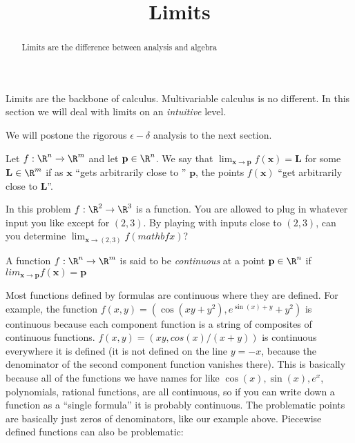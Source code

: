 \documentclass{ximera}
\title{Limits}
\begin{document}
\begin{abstract}
	Limits are the difference between analysis and algebra
\end{abstract}


Limits are the backbone of calculus.  Multivariable calculus is no different.  In this section we will deal with limits on an \textit{intuitive} level.

We will postone the rigorous $\epsilon-\delta$ analysis to the next section.
	
Let $f: \R^n \to \R^m$ and let $\mathbf{p} \in \R^n$.  We say that $\lim_{\mathbf{x} \to \mathbf{p}} f(\mathbf{x}) = \mathbf{L}$ for some $\mathbf{L} \in \R^m$ 
if as $\mathbf{x}$ ``gets arbitrarily close to '' $\mathbf{p}$, the points $f(\mathbf{x})$ ``get arbitrarily close to $\mathbf{L}$''.  
	
	\begin{question}
		In this problem $f:\R^2 \to \R^3$ is a function.  You are allowed to plug in whatever input you like except for $(2,3)$.   By playing with inputs close to $(2,3)$, can
		you determine
		$\lim_{\mathbf{x} \to (2,3)} f(mathbf{x})$?
	\end{question}
	
	
	
	\begin{definition}
		A function $f: \R^n \to \R^m$ is said to be \textit{continuous} at a point $\mathbf{p} \in \R^n$ if $lim_{\mathbf{x} \to \mathbf{p}} f(\mathbf{x}) = \mathbf{p}$
	\end{definition}
	
	Most functions defined by formulas are continuous where they are defined.  For example, the function
	$f(x,y) = (\cos(xy+y^2),e^{\sin(x)+y}+y^2)$ is continuous because each component function is a string of composites of continuous functions. 
	$f(x,y) = (xy,cos(x)/(x+y))$ is continuous everywhere it is defined (it is not defined on the line $y=-x$, because the denominator of the 
	second component function vanishes there).  This is basically because all of the functions we have names for like $\cos(x),\sin(x), e^x$, polynomials, 
	rational functions, are all continuous, so if you can write down a function as a ``single formula'' it is probably continuous. 
	The problematic points are basically just zeros of denominators, like our example above.  Piecewise defined functions can also be problematic:
	
\end{document}
